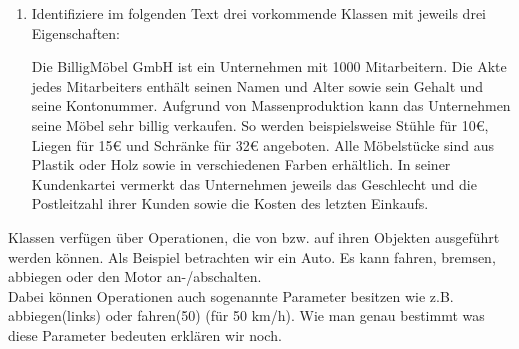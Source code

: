 \begin{enumerate}
    \item Identifiziere im folgenden Text drei vorkommende Klassen mit jeweils drei Eigenschaften:


    Die BilligMöbel GmbH ist ein Unternehmen mit 1000 Mitarbeitern.
    Die Akte jedes Mitarbeiters enthält seinen Namen und Alter sowie sein Gehalt und seine Kontonummer.
    Aufgrund von Massenproduktion kann das Unternehmen seine Möbel sehr billig verkaufen.
    So werden beispielsweise Stühle für 10€, Liegen für 15€ und Schränke für 32€ angeboten.
    Alle Möbelstücke sind aus Plastik oder Holz sowie in verschiedenen Farben erhältlich.
    In seiner Kundenkartei vermerkt das Unternehmen jeweils das Geschlecht und die Postleitzahl ihrer Kunden sowie die Kosten des letzten Einkaufs.
\end{enumerate}

\begin{Infobox}
    Klassen verfügen über Operationen, die von bzw. auf ihren Objekten ausgeführt werden können.
    Als Beispiel betrachten wir ein Auto. Es kann fahren, bremsen, abbiegen oder den Motor an-/abschalten.\\

    Dabei können Operationen auch sogenannte Parameter besitzen wie z.B. abbiegen(links) oder fahren(50) (für 50 km/h).
    Wie man genau bestimmt was diese Parameter bedeuten erklären wir noch.
\end{Infobox}

